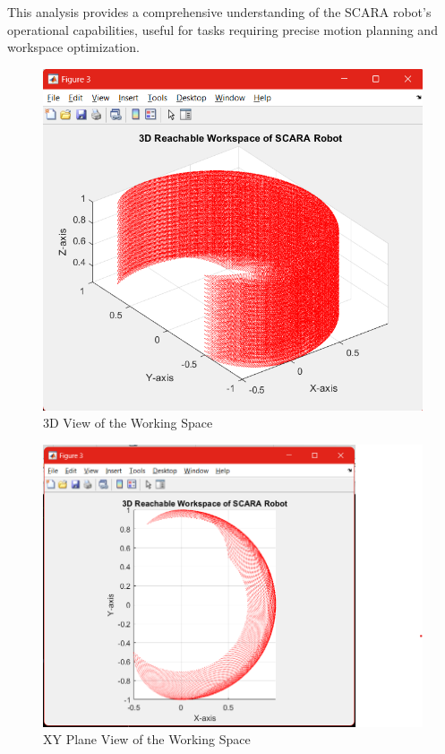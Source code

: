 \documentclass[12pt]{report}
\begin{document}
This analysis provides a comprehensive understanding of the SCARA robot's operational capabilities, useful for tasks requiring precise motion planning and workspace optimization.
\begin{figure}[H]
	\centering
	\includegraphics[scale=1]{W1} %
	\caption{3D View of the Working Space}
	\label{W} %
\end{figure}
\begin{figure}[H]
	\centering
	\includegraphics[scale=1]{W2} %
	\caption{XY Plane View of the Working Space}
	\label{W2} %
\end{figure}
\end{document}
